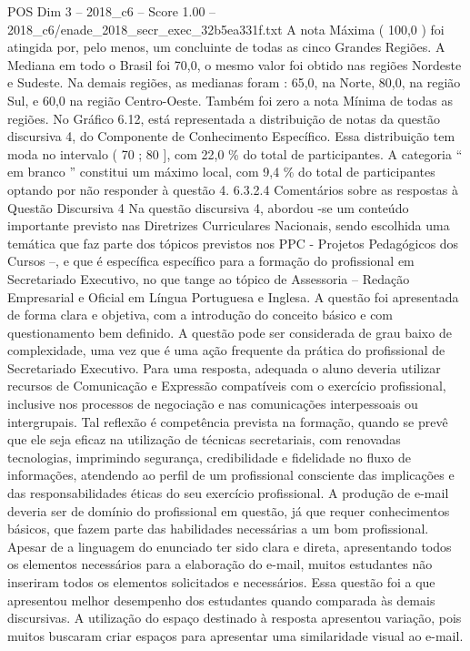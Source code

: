 \begin{textsample}{POS Dim 3 – 2018\_c6 – Score 1.00 – 2018\_c6/enade\_2018\_secr\_exec\_32b5ea331f.txt}
A nota Máxima ( 100,0 ) foi atingida por, pelo menos, um concluinte de todas as cinco Grandes Regiões.
A Mediana em todo o Brasil foi 70,0, o mesmo valor foi obtido nas regiões Nordeste e Sudeste.
Na demais regiões, as medianas foram : 65,0, na Norte, 80,0, na região Sul, e 60,0 na região Centro-Oeste.
Também foi zero a nota Mínima de todas as regiões.
No Gráfico 6.12, está representada a distribuição de notas da questão discursiva 4, do Componente de Conhecimento Específico.
Essa distribuição tem moda no intervalo ( 70 ; 80 ], com 22,0 \% do total de participantes.
A categoria “ em branco ” constitui um máximo local, com 9,4 \% do total de participantes optando por não responder à questão 4. 6.3.2.4 Comentários sobre as respostas à Questão Discursiva 4 Na questão discursiva 4, abordou -se um conteúdo importante previsto nas Diretrizes Curriculares Nacionais, sendo escolhida uma temática que faz parte dos tópicos previstos nos PPC - Projetos Pedagógicos dos Cursos –, e que é específica específico para a formação do profissional em Secretariado Executivo, no que tange ao tópico de Assessoria – Redação Empresarial e Oficial em Língua Portuguesa e Inglesa.
A questão foi apresentada de forma clara e objetiva, com a introdução do conceito básico e com questionamento bem definido.
A questão pode ser considerada de grau baixo de complexidade, uma vez que é uma ação frequente da prática do profissional de Secretariado Executivo.
Para uma resposta, adequada o aluno deveria utilizar recursos de Comunicação e Expressão compatíveis com o exercício profissional, inclusive nos processos de negociação e nas comunicações interpessoais ou intergrupais.
Tal reflexão é competência prevista na formação, quando se prevê que ele seja eficaz na utilização de técnicas secretariais, com renovadas tecnologias, imprimindo segurança, credibilidade e fidelidade no fluxo de informações, atendendo ao perfil de um profissional consciente das implicações e das responsabilidades éticas do seu exercício profissional.
A produção de e-mail deveria ser de domínio do profissional em questão, já que requer conhecimentos básicos, que fazem parte das habilidades necessárias a um bom profissional.
Apesar de a linguagem do enunciado ter sido clara e direta, apresentando todos os elementos necessários para a elaboração do e-mail, muitos estudantes não inseriram todos os elementos solicitados e necessários.
Essa questão foi a que apresentou melhor desempenho dos estudantes quando comparada às demais discursivas.
A utilização do espaço destinado à resposta apresentou variação, pois muitos buscaram criar espaços para apresentar uma similaridade visual ao e-mail.

\end{textsample}
